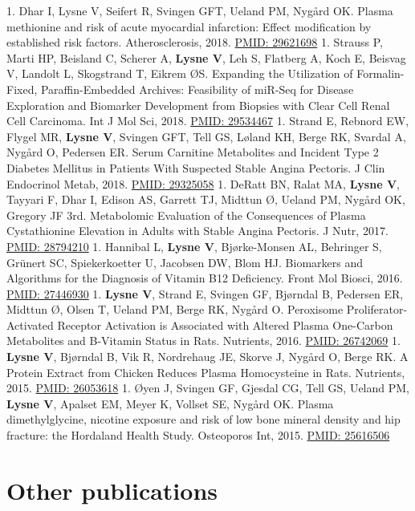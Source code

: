 \documentclass[11pt, a4paper]{awesome-cv}
\begin{document}
1. Dhar I, Lysne V, Seifert R, Svingen GFT, Ueland PM, Nygård OK. Plasma methionine and risk of acute myocardial infarction: Effect modification by established risk factors. Atherosclerosis, 2018. \href{https://www.ncbi.nlm.nih.gov/pubmed/29621698}{PMID: 29621698}
1. Strauss P, Marti HP, Beisland C, Scherer A, \textbf{Lysne V}, Leh S, Flatberg A, Koch E, Beisvag V, Landolt L, Skogstrand T, Eikrem ØS. Expanding the Utilization of Formalin-Fixed, Paraffin-Embedded Archives: Feasibility of miR-Seq for Disease Exploration and Biomarker Development from Biopsies with Clear Cell Renal Cell Carcinoma. Int J Mol Sci, 2018. \href{https://www.ncbi.nlm.nih.gov/pubmed/29534467}{PMID: 29534467}
1. Strand E, Rebnord EW, Flygel MR, \textbf{Lysne V}, Svingen GFT, Tell GS, Løland KH, Berge RK, Svardal A, Nygård O, Pedersen ER. Serum Carnitine Metabolites and Incident Type 2 Diabetes Mellitus in Patients With Suspected Stable Angina Pectoris. J Clin Endocrinol Metab, 2018. \href{https://www.ncbi.nlm.nih.gov/pubmed/29325058}{PMID: 29325058}
1. DeRatt BN, Ralat MA, \textbf{Lysne V}, Tayyari F, Dhar I, Edison AS, Garrett TJ, Midttun Ø, Ueland PM, Nygård OK, Gregory JF 3rd. Metabolomic Evaluation of the Consequences of Plasma Cystathionine Elevation in Adults with Stable Angina Pectoris. J Nutr, 2017. \href{https://www.ncbi.nlm.nih.gov/pubmed/28794210}{PMID: 28794210}
1. Hannibal L, \textbf{Lysne V}, Bjørke-Monsen AL, Behringer S, Grünert SC, Spiekerkoetter U, Jacobsen DW, Blom HJ. Biomarkers and Algorithms for the Diagnosis of Vitamin B12 Deficiency. Front Mol Biosci, 2016. \href{https://www.ncbi.nlm.nih.gov/pubmed/}{PMID: 27446930}
1. \textbf{Lysne V}, Strand E, Svingen GF, Bjørndal B, Pedersen ER, Midttun Ø, Olsen T, Ueland PM, Berge RK, Nygård O. Peroxisome Proliferator-Activated Receptor Activation is Associated with Altered Plasma One-Carbon Metabolites and B-Vitamin Status in Rats. Nutrients, 2016. \href{https://www.ncbi.nlm.nih.gov/pubmed/26742069}{PMID: 26742069}
1. \textbf{Lysne V}, Bjørndal B, Vik R, Nordrehaug JE, Skorve J, Nygård O, Berge RK. A Protein Extract from Chicken Reduces Plasma Homocysteine in Rats. Nutrients, 2015. \href{https://www.ncbi.nlm.nih.gov/pubmed/26053618}{PMID: 26053618}
1. Øyen J, Svingen GF, Gjesdal CG, Tell GS, Ueland PM, \textbf{Lysne V}, Apalset EM, Meyer K, Vollset SE, Nygård OK. Plasma dimethylglycine, nicotine exposure and risk of low bone mineral density and hip fracture: the Hordaland Health Study. Osteoporos Int, 2015. \href{https://www.ncbi.nlm.nih.gov/pubmed/25616506}{PMID: 25616506}

\hypertarget{other-publications}{%
\section{Other publications}\label{other-publications}}
\end{document}
